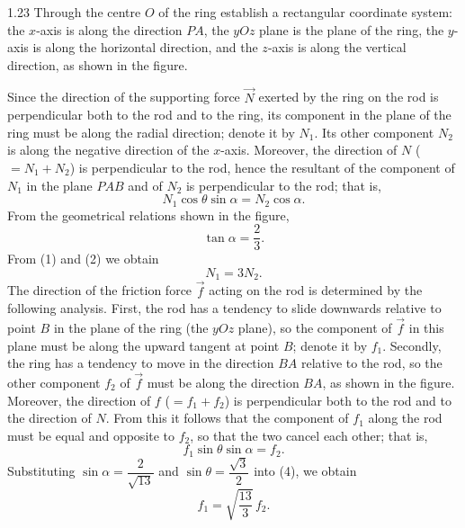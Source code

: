 \begin{solution}{1.23}
Through the centre $O$ of the ring establish a rectangular coordinate system: the $x$-axis is along the direction $PA$, the $yOz$ plane is the plane of the ring, the $y$-axis is along the horizontal direction, and the $z$-axis is along the vertical direction, as shown in the figure.

Since the direction of the supporting force $\vec{N}$ exerted by the ring on the rod is perpendicular both to the rod and to the ring, its component in the plane of the ring must be along the radial direction; denote it by $N_1$. Its other component $N_2$ is along the negative direction of the $x$-axis. Moreover, the direction of $N$ ($=N_1+N_2$) is perpendicular to the rod, hence the resultant of the component of $N_1$ in the plane $PAB$ and of $N_2$ is perpendicular to the rod; that is,
\begin{equation}
N_1\cos\theta\sin\alpha=N_2\cos\alpha. \tag{1}
\end{equation}
From the geometrical relations shown in the figure,
\begin{equation}
\tan\alpha=\frac{2}{3}. \tag{2}
\end{equation}
From (1) and (2) we obtain
\begin{equation}
N_1=3N_2. \tag{3}
\end{equation}
The direction of the friction force $\vec{f}$ acting on the rod is determined by the following analysis. First, the rod has a tendency to slide downwards relative to point $B$ in the plane of the ring (the $yOz$ plane), so the component of $\vec{f}$ in this plane must be along the upward tangent at point $B$; denote it by $f_1$. Secondly, the ring has a tendency to move in the direction $BA$ relative to the rod, so the other component $f_2$ of $\vec{f}$ must be along the direction $BA$, as shown in the figure. Moreover, the direction of $f$ ($=f_1+f_2$) is perpendicular both to the rod and to the direction of $N$. From this it follows that the component of $f_1$ along the rod must be equal and opposite to $f_2$, so that the two cancel each other; that is,
\begin{equation}
f_1\sin\theta\sin\alpha=f_2. \tag{4}
\end{equation}
Substituting $\sin\alpha=\dfrac{2}{\sqrt{13}}$ and $\sin\theta=\dfrac{\sqrt{3}}{2}$ into (4), we obtain
\begin{equation}
f_1=\sqrt{\frac{13}{3}}\,f_2. \tag{5}
\end{equation}


\end{solution}
